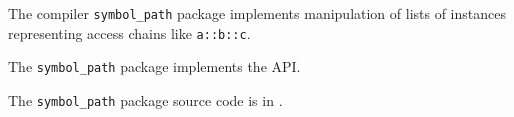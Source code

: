 
The compiler {\tt symbol\_path} package implements 
manipulation of lists of  instances representing access chains like 
{\tt a::b::c}.

The {\tt symbol\_path} package implements the  API.

The {\tt symbol\_path} package source code is in .


